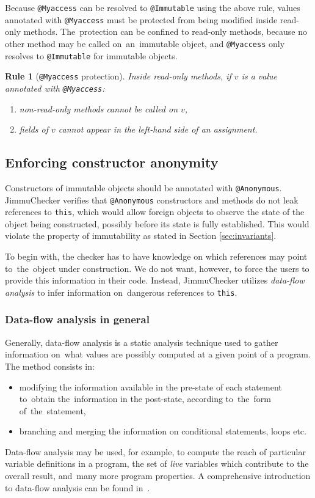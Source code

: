 \documentclass{pracamgr}
\theoremstyle{break}
\theoremstyle{break}
\theoremstyle{break}
\newtheorem{verrule}{Rule}
\begin{document}
Because \texttt{@Myaccess} can be resolved to \texttt{@Immutable}
using the above rule, values annotated with \texttt{@Myaccess} must be
protected from being modified inside read-only methods. The~protection
can be confined to read-only methods, because no other method may be
called on~an~immutable object, and \texttt{@Myaccess} only resolves to
\texttt{@Immutable} for immutable objects.

\begin{verrule}[\texttt{@Myaccess} protection]
  Inside read-only methods, if $v$ is a value annotated with
  \texttt{@Myaccess}:
  \begin{enumerate}
  \item non-read-only methods cannot be called on $v$, 
  \item fields of $v$ cannot appear in the left-hand side of an
    assignment.
  \end{enumerate}
\end{verrule}

\subsection{Enforcing constructor anonymity}
\label{sec:chk:anon}

Constructors of immutable objects should be annotated with
\texttt{@Anonymous}. JimmuChecker verifies that \texttt{@Anonymous}
constructors and methods do not leak references to \texttt{this},
which would allow foreign objects to observe the state of the object
being constructed, possibly before its state is fully
established. This would violate the property of immutability as stated
in Section \ref{sec:invariants}. 

To begin with, the checker has to have knowledge on which references
may point to~the~object under construction. We do not want, however,
to force the users to provide this information in their code. Instead,
JimmuChecker utilizes \emph{data-flow analysis} to infer information
on~dangerous references to \texttt{this}.

\subsubsection{Data-flow analysis in general} 

Generally, data-flow analysis is a static analysis technique used to
gather information on~what va\-lu\-es are possibly computed at a given
point of a program. The method consists in:
\begin{itemize}
\item modifying the information available in the pre-state of each
  statement to~obtain the~information in the post-state, according
  to~the~form of~the~statement, 
\item branching and merging the information on conditional statements,
  loops etc.
\end{itemize}
Data-flow analysis may be used, for example, to compute the reach of
particular variable definitions in a program, the set of \emph{live}
variables which contribute to the overall result, and~many more
program properties. A comprehensive introduction to data-flow analysis
can be found in~\cite{dataflow}. 
\end{document}
